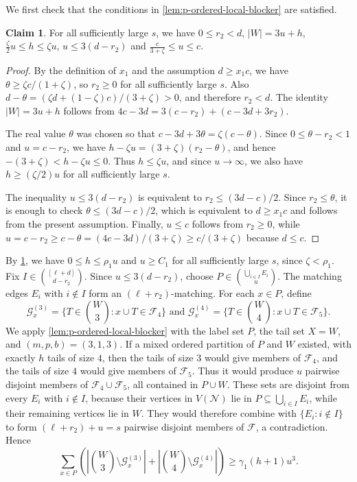 \documentclass[10pt,a4paper]{article}
\numberwithin{equation}{section}
\theoremstyle{definition}
\newtheorem{claim}[claim]{Claim}
\newcommand{\F}{\mathcal F}
\newcommand{\G}{\mathcal G}
\begin{document}
We first check that the conditions in \cref{lem:p-ordered-local-blocker} are satisfied.

\begin{claim}\label{clm:large-parameter-check}
        For all sufficiently large $s$, we have $ 0\le r_2<d$, $|W|=3u+h$, $\frac{\zeta}{2}u\le h\le\zeta u$, $u\le3(d-r_2)$ and $\frac{c}{3+\zeta}\le u\le c$.
\end{claim}
\begin{proof}
        By the definition of $x_1$ and the assumption $d\ge x_1c$, we have $\theta\ge \zeta c/(1+\zeta)$, so $r_2\ge0$ for all sufficiently large $s$. Also $d-\theta=(\zeta d+(1-\zeta)c)/(3+\zeta)>0$, and therefore $r_2<d$. The identity $|W|=3u+h$ follows from $4c-3d=3(c-r_2)+(c-3d+3r_2)$.

        The real value $\theta$ was chosen so that $c-3d+3\theta=\zeta(c-\theta)$. Since $0\le\theta-r_2<1$ and $u=c-r_2$, we have $h-\zeta u=(3+\zeta)(r_2-\theta)$, and hence $-(3+\zeta)<h-\zeta u\le0$. Thus $h\le\zeta u$, and since $u\to\infty$, we also have $h\ge(\zeta/2)u$ for all sufficiently large $s$.

        The inequality $u\le3(d-r_2)$ is equivalent to $r_2\le(3d-c)/2$. Since $r_2\le\theta$, it is enough to check $\theta\le(3d-c)/2$, which is equivalent to $d\ge x_1c$ and follows from the present assumption. Finally, $u\le c$ follows from $r_2\ge0$, while $u=c-r_2\ge c-\theta=(4c-3d)/(3+\zeta)\ge c/(3+\zeta)$ because $d\le c$.
\end{proof}

By \cref{clm:large-parameter-check}, we have $0\le h\le\rho_1u$ and $u\ge C_1$ for all sufficiently large $s$, since $\zeta<\rho_1$. Fix $I\in\binom{[\ell+d]}{d-r_2}$. Since $u\le3(d-r_2)$, choose $P\in\binom{\bigcup_{i\in I}E_i}{u}$. The matching edges $E_i$ with $i\notin I$ form an $(\ell+r_2)$-matching. For each $x\in P$, define
\[
        \G_x^{(3)}=\{T\in\binom W3:x\cup T\in\F_4\} \text{ and }
        \G_x^{(4)}=\{T\in\binom W4:x\cup T\in\F_5\}.
\]
We apply \cref{lem:p-ordered-local-blocker} with the label set $P$, the tail set $X=W$, and $(m,p,b)=(3,1,3)$. If a mixed ordered partition of $P$ and $W$ existed, with exactly $h$ tails of size $4$, then the tails of size $3$ would give members of $\F_4$, and the tails of size $4$ would give members of $\F_5$. Thus it would produce $u$ pairwise disjoint members of $\F_4\cup\F_5$, all contained in $P\cup W$. These sets are disjoint from every $E_i$ with $i\notin I$, because their vertices in $V(\mathcal N)$ lie in $P\subseteq\bigcup_{i\in I}E_i$, while their remaining vertices lie in $W$. They would therefore combine with $\{E_i:i\notin I\}$ to form $(\ell+r_2)+u=s$ pairwise disjoint members of $\F$, a contradiction. Hence
\[
        \sum_{x\in P}
        \left(
        \left|\binom W3\setminus\G_x^{(3)}\right|
        +
        \left|\binom W4\setminus\G_x^{(4)}\right|
        \right)
        \ge
        \gamma_1(h+1)u^3.
\]
\end{document}
